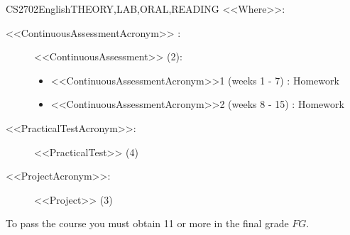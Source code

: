 \begin{evaluation}{CS2702}{English}{THEORY,LAB,ORAL,READING}
    \vspace{2mm}
    \noindent <<Where>>:
    \begin{description}
      \item[<<ContinuousAssessmentAcronym>> :] <<ContinuousAssessment>> (2):
          \begin{itemize}
              \item  <<ContinuousAssessmentAcronym>>1 (weeks 1 - 7)  : Homework
              \item <<ContinuousAssessmentAcronym>>2 (weeks 8 - 15) : Homework
          \end{itemize}
      \item[<<PracticalTestAcronym>>:] <<PracticalTest>> (4)
      \item[<<ProjectAcronym>>:] <<Project>> (3)       
    \end{description}

  \noindent To pass the course you must obtain 11 or more in the final grade $FG$.
  \end{evaluation}
 

